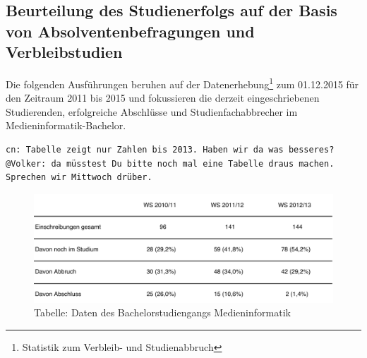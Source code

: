\subsection{Beurteilung des Studienerfolgs auf der Basis von
Absolventenbefragungen und
Verbleibstudien}\label{beurteilung-des-studienerfolgs-auf-der-basis-von-absolventenbefragungen-und-verbleibstudien}

Die folgenden Ausführungen beruhen auf der Datenerhebung\footnote{Statistik
  zum Verbleib- und Studienabbruch} zum 01.12.2015 für den Zeitraum 2011
bis 2015 und fokussieren die derzeit eingeschriebenen Studierenden,
erfolgreiche Abschlüsse und Studienfachabbrecher im
Medieninformatik-Bachelor.

\begin{verbatim}
cn: Tabelle zeigt nur Zahlen bis 2013. Haben wir da was besseres?
@Volker: da müsstest Du bitte noch mal eine Tabelle draus machen. Sprechen wir Mittwoch drüber. 
\end{verbatim}

\begin{figure}[htbp][htbp]
\centering
\includegraphics[width=\columnwidth]{../anhaenge/tabellen/MI-BA-anzahl-studierende.pdf}
\caption{Tabelle: Daten des Bachelorstudiengangs Medieninformatik}
\end{figure}

